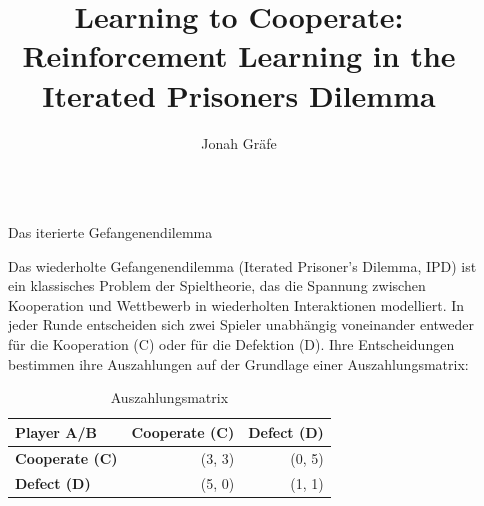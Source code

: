 \documentclass[final]{beamer}
\title{Learning to Cooperate: Reinforcement Learning in the Iterated Prisoners Dilemma}
\author{Jonah Gräfe}
\newlength{\sepwidth}
\newlength{\colwidth}
\newcommand{\separatorcolumn}{\begin{column}{\sepwidth}\end{column}}
\begin{document}



\begin{frame}[t]
\begin{columns}[t]
\separatorcolumn

\begin{column}{\colwidth}

  \begin{exampleblock}{Das iterierte Gefangenendilemma}

    Das wiederholte Gefangenendilemma (Iterated Prisoner's Dilemma, IPD) ist ein klassisches Problem der Spieltheorie, 
    das die Spannung zwischen Kooperation und Wettbewerb in wiederholten Interaktionen modelliert. In jeder Runde entscheiden sich 
    zwei Spieler unabhängig voneinander entweder für die Kooperation (C) oder für die Defektion (D). Ihre Entscheidungen bestimmen 
    ihre Auszahlungen auf der Grundlage einer Auszahlungsmatrix:

    \begin{table}
      \centering
      \begin{tabular}{l r r }
        \toprule
        \textbf{Player A/B} & \textbf{Cooperate (C)} & \textbf{Defect (D)}\\
        \midrule
        \textbf{Cooperate (C)} & (3, 3) & (0, 5) \\
        \midrule
        \textbf{Defect (D)} & (5, 0) & (1, 1) \\
        \bottomrule
      \end{tabular}
      \caption{Auszahlungsmatrix}
    \end{table}

  

\end{exampleblock}
\end{column}
\end{columns}
\end{frame}
\end{document}
